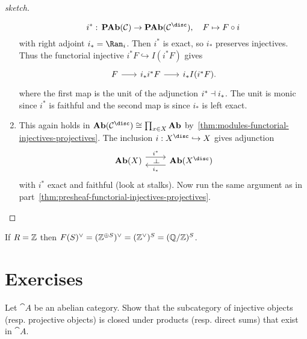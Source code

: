 \documentclass[../main.tex]{subfiles}
\begin{document}
\begin{proof}[sketch]
\begin{enumerate}
        \[i^*\colon \catAbelianPresheaf(\cat C) \to \catAbelianPresheaf(\cat C^{\disc}),\quad F\mapsto F\circ i\] with right adjoint $i_* = \Ran_i$.  Then $i^*$ is exact, so $i_*$ preserves injectives. Thus the functorial injective $i^* F\hookrightarrow I(i^* F)$ gives
        \[\begin{tikzcd}[column sep=scriptsize]
            F \ar[r] & i_*i^* F \ar[r] & i_* I(i^* F).
        \end{tikzcd}\]
        where the first map is the unit of the adjunction \(i^*\dashv i_*\).
        The unit is monic since $i^*$ is faithful and the second map is since $i_*$ is left exact.
        \item This again holds in $\catAbelianGroup(\cat C^{\disc}) \cong \prod_{x\in X} \catAbelianGroup$ by~\cref{thm:modules-functorial-injectives-projectives}. The inclusion $i\colon X^{\disc}\hookrightarrow X$ gives adjunction
        \begin{equation*}
          \begin{tikzcd}
            \catAbelianGroup(X) \ar[r, "i^*"{name=leftadj}, shift left=2] & \catAbelianGroup(X^{\disc}) \ar[l, "i_*"{name=rightadj}, shift left=2]
            \ar[from=leftadj, to=rightadj, phantom, "\leftadj" marking]
          \end{tikzcd}
        \end{equation*}
        with $i^*$ exact and faithful (look at stalks). Now run the same argument as in part~\cref{thm:presheaf-functorial-injectives-projectives}.\qedhere
    \end{enumerate}
\end{proof}

\begin{exmp}
    If $R = \mathbb{Z}$ then $F(S)^\vee = (\mathbb{Z}^{\oplus S})^\vee = (\mathbb{Z}^\vee)^S = (\mathbb{Q}/ \mathbb{Z})^S$.
\end{exmp}

\section*{Exercises}


\begin{exe}
    Let $\cat A$ be an abelian category. Show that the subcategory of injective objects (resp. projective objects) is closed under products (resp. direct sums) that exist in $\cat A$.
\end{exe}
\end{document}
